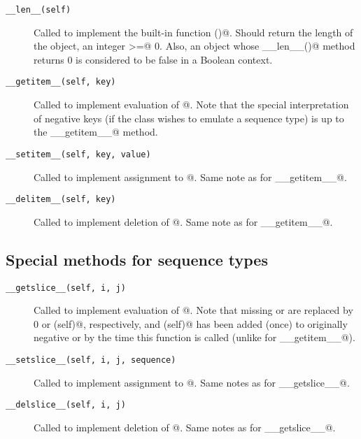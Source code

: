 \begin{description}

\item[{\tt __len__(self)}]
Called to implement the built-in function \verb@len()@.  Should return
the length of the object, an integer \verb@>=@ 0.  Also, an object
whose \verb@__len__()@ method returns 0 is considered to be false in a
Boolean context.

\item[{\tt __getitem__(self, key)}]
Called to implement evaluation of \verb@self[key]@.  Note that the
special interpretation of negative keys (if the class wishes to
emulate a sequence type) is up to the \verb@__getitem__@ method.

\item[{\tt __setitem__(self, key, value)}]
Called to implement assignment to \verb@self[key]@.  Same note as for
\verb@__getitem__@.

\item[{\tt __delitem__(self, key)}]
Called to implement deletion of \verb@self[key]@.  Same note as for
\verb@__getitem__@.

\end{description}


\subsection{Special methods for sequence types}

\begin{description}

\item[{\tt __getslice__(self, i, j)}]
Called to implement evaluation of \verb@self[i:j]@.  Note that missing
\verb@i@ or \verb@j@ are replaced by 0 or \verb@len(self)@,
respectively, and \verb@len(self)@ has been added (once) to originally
negative \verb@i@ or \verb@j@ by the time this function is called
(unlike for \verb@__getitem__@).

\item[{\tt __setslice__(self, i, j, sequence)}]
Called to implement assignment to \verb@self[i:j]@.  Same notes as for
\verb@__getslice__@.

\item[{\tt __delslice__(self, i, j)}]
Called to implement deletion of \verb@self[i:j]@.  Same notes as for
\verb@__getslice__@.

\end{description}


